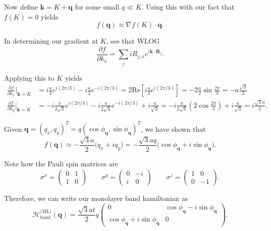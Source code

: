 \documentclass[12pt]{revtex4-2}
\newcommand{\real}{\text{Re}}
\begin{document}
Now define $\mathbf{k} = K + \mathbf{q}$ for some small $q \ll K$.  Using this with our fact that $f(K) = 0$ yields
\begin{equation}
    f(\mathbf{q}) \approx \nabla f(K) \cdot \mathbf{q}.
\end{equation}

In determining our gradient at $K$, see that WLOG
\begin{equation}
    \frac{\partial f}{\partial k_x} = \sum_j i R_{j,x} e^{i \mathbf{k} \cdot \mathbf{R}_j}.
\end{equation}

Applying this to $K$ yields
\begin{align}
    \frac{\partial f}{\partial k_x}\bigg|_{\mathbf{k}=K} &= i\frac{a}{2}e^{i(2\pi/3)} - i\frac{a}{2} e^{-i(2\pi/3)} = 2\real \left[ i\frac{a}{2} e^{i (2\pi/3)} \right] = -2\frac{a}{2}\sin \frac{2\pi}{3} = -a \frac{\sqrt{3}}{2} \\
    \frac{\partial f}{\partial k_y}\bigg|_{\mathbf{k}=K} &= -i\frac{a}{2\sqrt{3}} e^{i(2\pi/3)} - i\frac{a}{2\sqrt{3}} e^{-i(2\pi/3)} + i\frac{a}{\sqrt{3}} = -i \frac{a}{2\sqrt{3}}\left( 2\cos\frac{2\pi}{3} \right) + i\frac{a}{\sqrt{3}} = i\frac{\sqrt{3}a}{2}.
\end{align}

Given $\mathbf{q} = (q_x,q_y)^T = q(\cos \phi_\mathbf{q},\sin \phi_\mathbf{q})^T$, we have shown that
\begin{equation}
    f(\mathbf{q}) \approx -\frac{\sqrt{3}a}{2} \big( q_x + iq_y \big) = -\frac{\sqrt{3}aq}{2} \big( \cos\phi_\mathbf{q} + i\sin\phi_\mathbf{q} \big).
\end{equation}

Note how the Pauli spin matrices are
\begin{equation}
    \sigma^x = \begin{pmatrix}
        0 & 1 \\ 1 & 0 
    \end{pmatrix} \qquad \sigma^y = \begin{pmatrix}
        0 & -i \\ i & 0
    \end{pmatrix} \qquad \sigma^z = \begin{pmatrix}
        1 & 0 \\0 & -1
    \end{pmatrix}.
\end{equation}

Therefore, we can write our monolayer band hamiltonian as
\begin{equation}
    \mathcal{H}_\text{band}^\text{(ML)}(\mathbf{q}) = \frac{\sqrt{3}at}{2}q\begin{pmatrix}
        0 & \cos\phi_\mathbf{q} - i\sin\phi_\mathbf{q} \\
        \cos\phi_\mathbf{q} + i\sin\phi_\mathbf{q} & 0
    \end{pmatrix}.
\end{equation}
\end{document}
